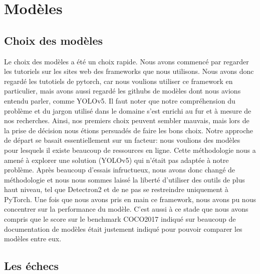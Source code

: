 \chapter{Modèles}
\label{chap:Modeles}

\section{Choix des modèles}
Le choix des modèles a été un choix rapide.\newline
Nous avons commencé par regarder les tutoriels sur les sites web des frameworks que nous utilisons. Nous avons donc regardé les tutotiels de pytorch, car nous voulions utiliser ce framework en particulier, mais avons aussi regardé les githubs de modèles dont nous avions entendu parler, comme YOLOv5. Il faut noter que notre compréhension du problème et du jargon utilisé dans le domaine s’est enrichi au fur et à mesure de nos recherches. \newline 
Ainsi, nos premiers choix peuvent sembler mauvais, mais lors de la prise de décision nous étions persuadés de faire les bons choix. Notre approche de départ se basait essentiellement sur un facteur: nous voulions des modèles pour lesquels il existe beaucoup de ressources en ligne. Cette méthodologie nous a amené à explorer une solution (YOLOv5) qui n’était pas adaptée à notre problème. \newline
Après beaucoup d’essais infructueux, nous avons donc changé de méthodologie et nous nous sommes laissé la liberté d’utiliser des outils de plus haut niveau, tel que Detectron2 et de ne pas se restreindre uniquement à PyTorch. Une fois que nous avons pris en main ce framework, nous avons pu nous concentrer sur la performance du modèle. C'est aussi à ce stade que nous avons compris que le score sur le benchmark COCO2017 indiqué sur beaucoup de documentation de modèles était justement indiqué pour pouvoir comparer les modèles entre eux.

\section{Les échecs}
